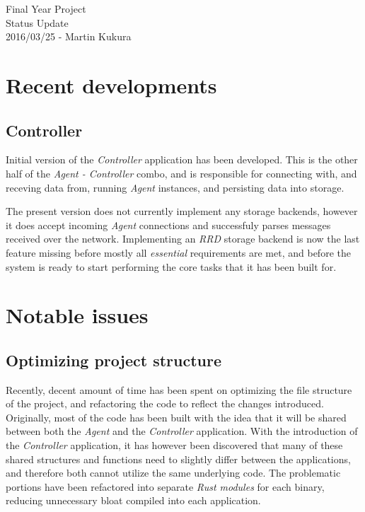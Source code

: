 \documentclass[12pt,a4paper,table]{article}
\begin{document}
    \begin{center}
        \Huge{Final Year Project}\\
        \LARGE{Status Update}\\
        \large{2016/03/25 - Martin Kukura}\\
    \end{center}


    \section{Recent developments}
        \subsection{Controller}
            Initial version of the \textit{Controller} application has been developed. This is the other half of the \textit{Agent - Controller} combo, and is responsible for connecting with, and receving data from, running \textit{Agent} instances, and persisting data into storage.

            The present version does not currently implement any storage backends, however it does accept incoming \textit{Agent} connections and successfuly parses messages received over the network. Implementing an \textit{RRD} storage backend is now the last feature missing before mostly all \textit{essential} requirements are met, and before the system is ready to start performing the core tasks that it has been built for.

    \section{Notable issues}
        \subsection{Optimizing project structure}
            Recently, decent amount of time has been spent on optimizing the file structure of the project, and refactoring the code to reflect the changes introduced. Originally, most of the code has been built with the idea that it will be shared between both the \textit{Agent} and the \textit{Controller} application. With the introduction of the \textit{Controller} application, it has however been discovered that many of these shared structures and functions need to slightly differ between the applications, and therefore both cannot utilize the same underlying code. The problematic portions have been refactored into separate \textit{Rust modules} for each binary, reducing unnecessary bloat compiled into each application.
\end{document}
